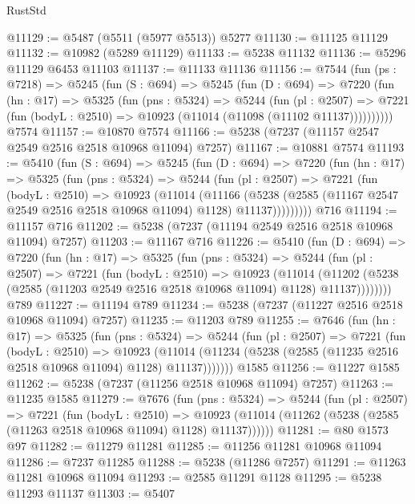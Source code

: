 \begin{lexlean}{RustStd}
\begin{coremodule}
@11129 := @5487 (@5511 (@5977 @5513)) @5277
@11130 := @11125 @11129
@11132 := @10982 (@5289 @11129)
@11133 := @5238 @11132
@11136 := @5296 @11129 @6453 @11103
@11137 := @11133 @11136
@11156 := @7544
    (fun (ps : @7218) =>
    @5245
      (fun (S : @694) =>
      @5245
        (fun (D : @694) =>
        @7220
          (fun (hn : @17) =>
          @5325
            (fun (pns : @5324) =>
            @5244
              (fun (pl : @2507) =>
              @7221 (fun (bodyL : @2510) => @10923 (@11014 (@11098 (@11102 @11137))))))))))
    @7574
@11157 := @10870 @7574
@11166 := @5238 (@7237 (@11157 @2547 @2549 @2516 @2518 @10968 @11094) @7257)
@11167 := @10881 @7574
@11193 := @5410
    (fun (S : @694) =>
    @5245
      (fun (D : @694) =>
      @7220
        (fun (hn : @17) =>
        @5325
          (fun (pns : @5324) =>
          @5244
            (fun (pl : @2507) =>
            @7221
              (fun (bodyL : @2510) =>
              @10923
                (@11014
                  (@11166
                    (@5238
                      (@2585 (@11167 @2547 @2549 @2516 @2518 @10968 @11094) @1128)
                      @11137)))))))))
    @716
@11194 := @11157 @716
@11202 := @5238 (@7237 (@11194 @2549 @2516 @2518 @10968 @11094) @7257)
@11203 := @11167 @716
@11226 := @5410
    (fun (D : @694) =>
    @7220
      (fun (hn : @17) =>
      @5325
        (fun (pns : @5324) =>
        @5244
          (fun (pl : @2507) =>
          @7221
            (fun (bodyL : @2510) =>
            @10923
              (@11014
                (@11202 (@5238 (@2585 (@11203 @2549 @2516 @2518 @10968 @11094) @1128) @11137))))))))
    @789
@11227 := @11194 @789
@11234 := @5238 (@7237 (@11227 @2516 @2518 @10968 @11094) @7257)
@11235 := @11203 @789
@11255 := @7646
    (fun (hn : @17) =>
    @5325
      (fun (pns : @5324) =>
      @5244
        (fun (pl : @2507) =>
        @7221
          (fun (bodyL : @2510) =>
          @10923
            (@11014 (@11234 (@5238 (@2585 (@11235 @2516 @2518 @10968 @11094) @1128) @11137)))))))
    @1585
@11256 := @11227 @1585
@11262 := @5238 (@7237 (@11256 @2518 @10968 @11094) @7257)
@11263 := @11235 @1585
@11279 := @7676
    (fun (pns : @5324) =>
    @5244
      (fun (pl : @2507) =>
      @7221
        (fun (bodyL : @2510) =>
        @10923 (@11014 (@11262 (@5238 (@2585 (@11263 @2518 @10968 @11094) @1128) @11137))))))
@11281 := @80 @1573 @97
@11282 := @11279 @11281
@11285 := @11256 @11281 @10968 @11094
@11286 := @7237 @11285
@11288 := @5238 (@11286 @7257)
@11291 := @11263 @11281 @10968 @11094
@11293 := @2585 @11291 @1128
@11295 := @5238 @11293 @11137
@11303 := @5407

\end{coremodule}
\end{lexlean}
